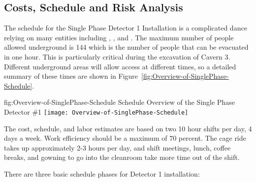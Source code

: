 \subsection{Costs, Schedule and Risk Analysis}
\label{sec:fdsp-tc-inst-cost}



The schedule for the Single Phase Detector 1 Installation is a complicated dance relying on many entities including , , and .  The maximum number of people allowed underground is 144 which is the number of people that can be evacuated in one hour.  This is particularly critical during the excavation of Cavern 3. Different underground areas will allow access at different times, so a detailed summary of these times are shown in Figure~\ref{fig:Overview-of-SinglePhase-Schedule}. 



\begin{dunefigure}
{fig:Overview-of-SinglePhase-Schedule}
{Schedule Overview of the Single Phase Detector \#1}                
\texttt{[image: Overview-of-SinglePhase-Schedule]}
\end{dunefigure}

The cost, schedule, and labor estimates are based on two 10 hour shifts per day, 4 days a week. Work efficiency should be a maximum of 70 percent.  The cage ride takes up approximately 2-3 hours per day, and shift meetings, lunch, coffee breaks, and gowning to go into the cleanroom take more time out of the shift. 

There are three basic schedule phases for Detector 1 installation:

